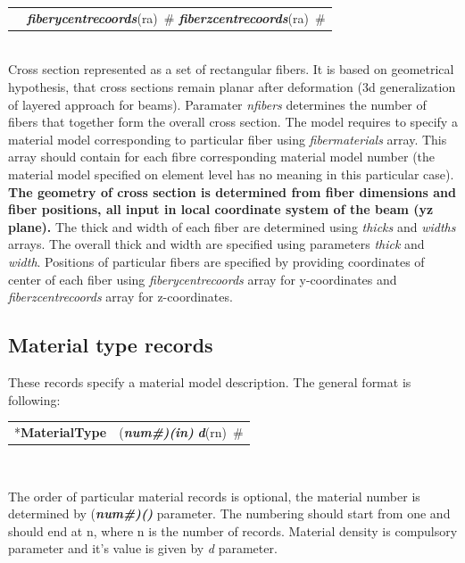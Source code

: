 \documentclass[a4paper]{article}
\makeatletter
\newcommand{\param}[1]{{\em #1}}
\newcommand{\fieldVal}[2]{\mbox{({\it\bf{#1}\#)\tiny (#2)}}}
\newcommand{\keywordnotype}[1]{\mbox{{\it{\bf{#1}}}}}
\newcommand{\keyword}[2]{\mbox{{\keywordnotype{#1}\tiny (#2)}}}
\newcommand{\entKeyword}[1]{\mbox{{*{\bf{#1}}}}}
\newcommand{\entKeywordInst}[1]{\mbox{{\bf{{#1}}}}}
\newcommand{\field}[2]{\mbox{\keyword{#1}{#2}~\#}}
\newenvironment{record}[1][]{\begin{tabular}{|ll}}{\end{tabular}\\}
\newcommand{\recentry}[2]{{#1}&{#2}\\}
\newcounter{rcc}
\newenvironment{record}[1][\textwidth]{\setcounter{rcc}{0}\begin{tabular*}{#1}{|ll@{\extracolsep{\fill}}r}}{\end{tabular*}\\}
\newcommand{\recentry}[2]{\ifthenelse{\value{rcc}>0}{&$\backslash$ \\}{\setcounter{rcc}{1}}{#1}&{#2}}
\makeatother
\begin{document}
\begin{itemize}
\begin{record}[0.9\textwidth]
    \recentry{}{\field{fiberycentrecoords}{ra} \field{fiberzcentrecoords}{ra}}
  \end{record}
  Cross section represented as a set of rectangular fibers. It is based on
geometrical hypothesis, that cross sections remain planar after
deformation (3d generalization of layered approach for beams).
Paramater \param{nfibers} determines the number of fibers that together form the overall cross section. 
The model requires to specify a material model corresponding to particular fiber using \param{fibermaterials} array. This array should contain for each fibre corresponding material model number (the material model specified on element level has no meaning in this particular case).
{\bf The geometry of cross section is determined from fiber dimensions and fiber positions, all input in local coordinate system of the beam (yz plane).} The thick and width of each fiber are determined using \param{thicks} and \param{widths} arrays. The overall thick and width are specified using parameters \param{thick} and \param{width}. Positions of particular fibers are specified by providing coordinates of center of each fiber using \param{fiberycentrecoords} array for y-coordinates and \param{fiberzcentrecoords} array for z-coordinates. 
\end{itemize}

\subsection{Material type  records}
\label{_MaterialTypeRecords}
These records specify a material model  description. The general format is
following:

\noindent
\begin{record}
  \recentry{\entKeyword{MaterialType}}{\fieldVal{num}{in} \field{d}{rn}}
\end{record}

The order of particular material records is optional, the material number is determined by \fieldVal{num}{} parameter.
The numbering should start from one and should end at n, where n is the number of records.
Material density is compulsory parameter and it's value is given by
\param{d} parameter.
\end{document}
